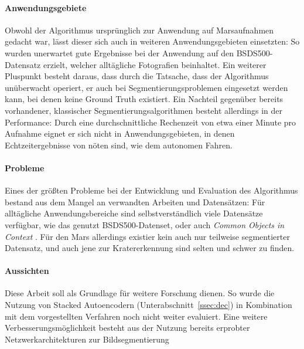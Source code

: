 \paragraph{Anwendungsgebiete} Obwohl der Algorithmus ursprünglich zur Anwendung auf Marsaufnahmen gedacht war, lässt dieser sich auch in weiteren Anwendungsgebieten einsetzten: So wurden \bspw unerwartet gute Ergebnisse bei der Anwendung auf den BSDS500-Datensatz \cite{bsd500} erzielt, welcher alltägliche Fotografien beinhaltet. Ein weiterer Pluspunkt besteht daraus, dass durch die Tatsache, dass der Algorithmus unüberwacht operiert, er auch bei Segmentierungsproblemen eingesetzt werden kann, bei denen keine Ground Truth existiert. Ein Nachteil gegenüber bereits vorhandener, klassischer Segmentierungsalgorithmen besteht allerdings in der Performance: Durch eine durchschnittliche Rechenzeit von etwa einer Minute pro Aufnahme eignet er sich nicht in Anwendungsgebieten, in denen Echtzeitergebnisse von nöten sind, wie \bspw dem autonomen Fahren.

\paragraph{Probleme} Eines der größten Probleme bei der Entwicklung und Evaluation des Algorithmus bestand aus dem Mangel an verwandten Arbeiten und Datensätzen: Für alltägliche Anwendungsbereiche sind selbstverständlich viele Datensätze verfügbar, wie das genutzt BSDS500-Datenset, oder auch \textit{Common Objects in Context} \cite{lin_14}. Für den Mars allerdings existier kein auch nur teilweise segmentierter Datensatz, und auch jene zur Kratererkennung sind selten und schwer zu finden.

\paragraph{Aussichten} Diese Arbeit soll als Grundlage für weitere Forschung dienen. So wurde \bspw die Nutzung von Stacked Autoencodern (\vgl Unterabschnitt~\ref{ssec:dec}) in Kombination mit dem vorgestellten Verfahren noch nicht weiter evaluiert. Eine weitere Verbesserungsmöglichkeit besteht aus der Nutzung bereits erprobter Netzwerkarchitekturen zur Bildsegmentierung